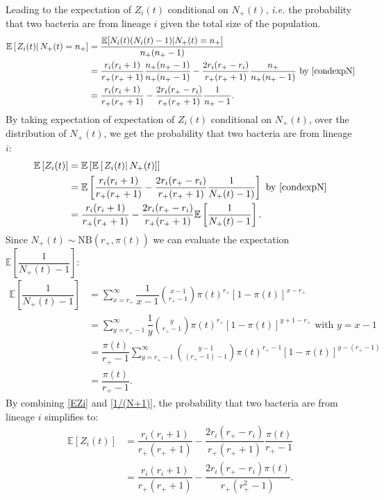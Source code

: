 \documentclass{article}
\begin{document}
Leading to the expectation of $Z_i(t)$ conditional on $N_+(t)$, \textit{i.e.} the probability that two bacteria are from lineage $i$ given the total size of the population. 
\begin{align}
  \mathbb{E}\left[ \left. Z_i(t)  \right\vert N_+(t)=n_+ \right] &= 
 \dfrac{\mathbb{E}[ N_i(t)(N_i(t)-1) \vert N_+(t)=n_+] }{n_+ (n_+ -1 ) }  \\
 &=\dfrac{r_i(r_i+1)}{r_+ (r_+ +1)} \dfrac{n_+ (n_+ -1 ) }{ n_+ (n_+ -1 ) }- \dfrac{2 r_i (r_+ -r_{i})}{r_+ (r_+ +1)} \dfrac{n_+}{ n_+ (n_+ -1 ) } \text{ by }\eqref{condexpN}\\
 &=\dfrac{r_i(r_i+1)}{r_+ (r_+ +1)}- \dfrac{2 r_i (r_+ -r_{i})}{r_+ (r_+ +1)} \dfrac{1}{ n_+ -1  }. \label{RelatednesscondexpN}
\end{align}
By taking expectation of expectation of $Z_i(t)$ conditional on $N_+(t)$, over the distribution of $N_+(t)$, we get the probability that two bacteria are from lineage $i$:
\begin{align}
\mathbb{E}\left[ Z_i(t) \right] &= 
 \mathbb{E}\left[ \mathbb{E}\left[ \left. Z_i(t) \right\vert N_+(t) \right] \right]\\
 &=\mathbb{E}\left[\dfrac{r_i(r_i+1)}{r_+ (r_+ +1)}- \dfrac{2 r_i (r_+ -r_{i})}{r_+ (r_+ +1)} \dfrac{1}{N_+(t)-1) } \right] \text{ by }\eqref{condexpN}\\
 &=\dfrac{r_i(r_i+1)}{r_+ (r_+ +1 )}-\dfrac{2 r_i (r_+ -r_{i})}{r_+ (r_+ +1 )}\mathbb{E}\left[\dfrac{1}{N_+(t)-1} \right]. \label{EZi}
\end{align}
Since $N_+(t) \sim \mathrm{NB} (r_+, \pi(t))$ we can evaluate the expectation $\mathbb{E}\left[\dfrac{1}{N_+(t)-1} \right]$:
\begin{align}
\mathbb{E}\left[\dfrac{1}{N_+(t)-1} \right] &= \sum_{x=r_+}^{\infty } \dfrac{1}{x-1} \binom{x-1}{r_+-1} \pi(t)^{r_+} [1-\pi(t)]^{x-r_+} \\
 &=\sum_{y=r_+-1}^{\infty} \dfrac{1}{y} \binom{y}{r_+-1} \pi(t)^{r_+} [1-\pi(t)]^{y+1-r_+} \text{ with }y=x-1\\
 &=\dfrac{\pi(t)}{r_+-1}\sum_{y=r_+-1}^{\infty}\binom{y-1}{(r_+-1)-1} \pi(t)^{r_+-1} [1-\pi(t)]^{y-(r_+-1)} \\ 
 &=\dfrac{\pi(t)}{r_+-1}.\label{1/(N+1)}
\end{align}
By combining \eqref{EZi} and \eqref{1/(N+1)}, the probability that two bacteria are from lineage $i$ simplifies to:
\begin{align}
\mathbb{E}\left[ Z_i(t) \right] &= \dfrac{r_i(r_i+1)}{r_+ (r_+ +1 )}-\dfrac{2 r_i (r_+ -r_{i})}{r_+ (r_+ +1 )}\dfrac{\pi(t)}{r_+-1}\\
 &=\dfrac{r_i(r_i+1)}{r_+ (r_+ +1 )}-\dfrac{2 r_i (r_+ -r_{i})\pi(t)}{r_+ (r_+^2 -1 )}. \label{PI:lineage}
\end{align}
\end{document}
